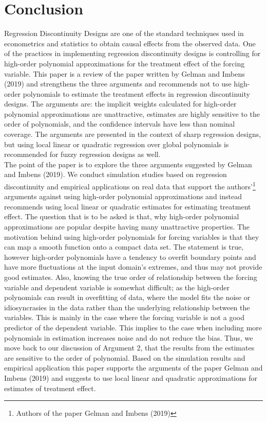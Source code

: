 \documentclass[fleqn]{article}
\begin{document}
    \section{Conclusion}
    \label{sec: conclusion}

    Regression Discontinuity Designs are one of the standard techniques used in econometrics and statistics to obtain causal effects from the observed data. One of the practices in implementing regression discontinuity designs is controlling for high-order polynomial approximations for the treatment effect of the forcing variable. This paper is a review of the paper written by Gelman and Imbens (2019)\cite{gelman2019high} and strengthens the three arguments and recommends not to use high-order polynomials to estimate the treatment effects in regression discontinuity designs. The arguments are: the implicit weights calculated for high-order polynomial approximations are unattractive, estimates are highly sensitive to the order of polynomials, and the confidence intervals have less than nominal coverage. The arguments are presented in the context of sharp regression designs, but using local linear or quadratic regression over global polynomials is recommended for fuzzy regression designs as well. \\
    
    The point of the paper is to explore the three arguments suggested by Gelman and Imbens (2019)\cite{gelman2019high}. We conduct simulation studies based on regression discontinuity and empirical applications on real data that support the authors'\footnote{Authors of the paper Gelman and Imbens (2019)\cite{gelman2019high}} arguments against using high-order polynomial approximations and instead recommends using local linear or quadratic estimates for estimating treatment effect. The question that is to be asked is that, why high-order polynomial approximations are popular despite having many unattractive properties. The motivation behind using high-order polynomials for forcing variables is that they can map a smooth function onto a compact data set. The statement is true, however high-order polynomials have a tendency to overfit boundary points and have more fluctuations at the input domain's extremes, and thus may not provide good estimates. Also, knowing the true order of relationship between the forcing variable and dependent variable is somewhat difficult; as the high-order polynomials can result in overfitting of data, where the model fits the noise or idiosyncrasies in the data rather than the underlying relationship between the variables. This is mainly in the case where the forcing variable is not a good predictor of the dependent variable. This implies to the case when including more polynomials in estimation increases noise and do not reduce the bias. Thus, we move back to our discussion of Argument 2, that the results from the estimates are sensitive to the order of polynomial. Based on the simulation results and empirical application this paper supports  the arguments of the paper Gelman and Imbens (2019)\cite{gelman2019high} and suggests to use local linear and quadratic approximations for estimates of treatment effect.
\end{document}
